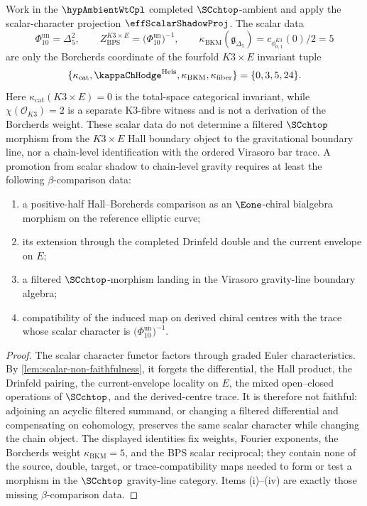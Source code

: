 \begin{proposition}
\label{prop:3dg-k3-scalar-no-promotion}
Work in the \(\hypAmbientWtCpl\) completed \(\SCchtop\)-ambient and
apply the scalar-character projection \(\effScalarShadowProj\).
The scalar data
\[
\Phi_{10}^{\mathrm{un}}=\Delta_5^2,\qquad
Z_{\mathrm{BPS}}^{K3\times E}=\bigl(\Phi_{10}^{\mathrm{un}}\bigr)^{-1},\qquad
\kappa_{\mathrm{BKM}}(\mathfrak g_{\Delta_5})
=c_{\phi_{0,1}^{K3}}(0)/2=5
\]
are only the Borcherds coordinate of the fourfold \(K3\times E\)
invariant tuple
\[
\{\kappa_{\mathrm{cat}},\kappaChHodge^{\mathrm{Heis}},
\kappa_{\mathrm{BKM}},\kappa_{\mathrm{fiber}}\}
=\{0,3,5,24\}.
\]
Here \(\kappa_{\mathrm{cat}}(K3\times E)=0\) is the total-space
categorical invariant, while \(\chi(\mathcal O_{K3})=2\) is a separate
K3-fibre witness and is not a derivation of the Borcherds weight.
These scalar data do not determine a filtered \(\SCchtop\) morphism from the
\(K3\times E\) Hall boundary object to the gravitational boundary
line, nor a chain-level identification with the ordered Virasoro bar
trace. A promotion from scalar shadow to chain-level gravity requires at
least the following \(\beta\)-comparison data:
\begin{enumerate}[label=\textup{(\roman*)}]
\item a positive-half Hall--Borcherds comparison as an
\(\Eone\)-chiral bialgebra morphism on the reference elliptic curve;
\item its extension through the completed Drinfeld double and the
current envelope on \(E\);
\item a filtered \(\SCchtop\)-morphism landing in the Virasoro
gravity-line boundary algebra;
\item compatibility of the induced map on derived chiral centres with
the trace whose scalar character is
\(\bigl(\Phi_{10}^{\mathrm{un}}\bigr)^{-1}\).
\end{enumerate}
\end{proposition}

\begin{proof}
The scalar character functor factors through graded Euler
characteristics. By
\cref{lem:scalar-non-faithfulness}, it forgets the differential, the
Hall product, the Drinfeld pairing, the current-envelope locality on
\(E\), the mixed open--closed operations of \(\SCchtop\), and the
derived-centre trace. It is therefore not faithful: adjoining an
acyclic filtered summand, or changing a filtered differential and
compensating on cohomology, preserves the same scalar character while
changing the chain object. The displayed identities fix weights,
Fourier exponents, the Borcherds weight
\(\kappa_{\mathrm{BKM}}=5\), and the BPS scalar reciprocal; they contain
none of the source, double, target, or trace-compatibility maps needed
to form or test a morphism in the \(\SCchtop\) gravity-line category.
Items \textup{(i)}--\textup{(iv)} are exactly those missing
\(\beta\)-comparison data.
\end{proof}

